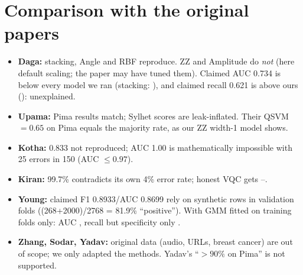 \documentclass[11pt,a4paper]{article}
\begin{document}
\section{Comparison with the original papers}
\begin{table}[H]\centering\scriptsize\caption{Paper-style results (bootstrap 95\% range of accuracy) vs claimed accuracy. Claims from \texttt{recheck/results/paper\_claims\_v2.csv}. N = test rows; ranges for small holdouts are wide.}
\end{table}
\begin{itemize}[leftmargin=1.5em]
\item \textbf{Daga:} stacking, Angle and RBF reproduce. ZZ and Amplitude do \emph{not} (here default scaling; the paper may have tuned them). Claimed AUC 0.734 is below every model we ran (stacking: \mDagaStackAUC), and claimed recall 0.621 is above ours (\mDagaStackRec): unexplained.
\item \textbf{Upama:} Pima results match; Sylhet scores are leak-inflated. Their QSVM$=0.65$ on Pima equals the majority rate, as our ZZ width-1 model shows.
\item \textbf{Kotha:} 0.833 not reproduced; AUC 1.00 is mathematically impossible with 25 errors in 150 (AUC $\le 0.97$).
\item \textbf{Kiran:} 99.7\% contradicts its own 4\% error rate; honest VQC gets \mKiranVQCpaperAcc--\mKiranVQCcleanAcc.
\item \textbf{Young:} claimed F1 0.8933/AUC 0.8699 rely on synthetic rows in validation folds ((268+2000)/2768 = 81.9\% ``positive''). With GMM fitted on training folds only: AUC \mYoungGMMauc, recall \mYoungGMMrec{} but specificity only \mYoungGMMspec.
\item \textbf{Zhang, Sodar, Yadav:} original data (audio, URLs, breast cancer) are out of scope; we only adapted the methods. Yadav's ``$>90\%$ on Pima'' is not supported.
\end{itemize}
\end{document}
